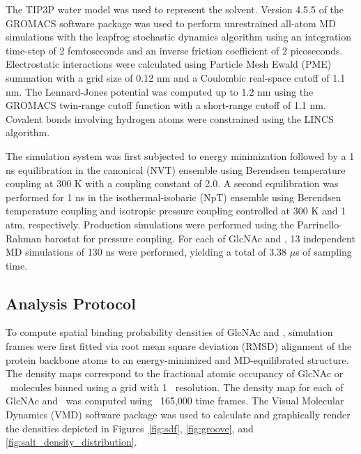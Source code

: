 The TIP3P water model\cite{Jorgensen:1983p8768} was used to represent the solvent. Version 4.5.5 of the GROMACS software package \cite{Pronk:2013ef,Hess:2008p5353} was used to perform unrestrained all-atom MD simulations with the leapfrog stochastic dynamics algorithm using an integration time-step of 2 femtoseconds and an inverse friction coefficient of 2 picoseconds. Electrostatic interactions were calculated using Particle Mesh Ewald (PME) summation\cite{Darden:1993p8963} with a grid size of 0.12 nm and a Coulombic real-space cutoff of 1.1 nm. The Lennard-Jones potential was computed up to 1.2 nm using the GROMACS twin-range cutoff function with a short-range cutoff of 1.1 nm. Covalent bonds involving hydrogen atoms were constrained using the LINCS algorithm.\cite{Hess:1997p9065}

The simulation system was first subjected to energy minimization followed by a 1 ns equilibration in the canonical (NVT) ensemble using Berendsen temperature coupling\cite{Berendsen:1984p9257} at 300 K with a coupling constant of 2.0. A second equilibration was performed for 1 ns in the isothermal-isobaric (NpT) ensemble using Berendsen temperature coupling\cite{Berendsen:1984p9257} and isotropic pressure coupling\cite{Berendsen:1984p9257} controlled at 300 K and 1 atm, respectively. Production simulations were performed using the Parrinello-Rahman barostat for pressure coupling.\cite{Parrinello:1981vy} For each of GlcNAc and \glucosamine, 13 independent MD simulations of 130 ns were performed, yielding a total of 3.38 $\mu$s of sampling time. 

\subsection*{Analysis Protocol}
To compute spatial binding probability densities of GlcNAc and \glucosamine, simulation frames were first fitted via root mean square deviation (RMSD) alignment of the protein backbone atoms to an energy-minimized and MD-equilibrated structure. The density maps correspond to the fractional atomic occupancy of GlcNAc or \glucosamine\ molecules binned using a grid with 1 \angstrom\ resolution. The density map for each of GlcNAc and \glucosamine\ was computed using ~165,000 time frames. The Visual Molecular Dynamics (VMD) software package\cite{Humphrey:1996to} was used to calculate and graphically render the densities depicted in Figures~\ref{fig:sdf}, \ref{fig:groove}, and \ref{fig:salt_density_distribution}.


